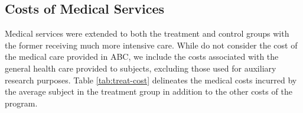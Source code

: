 \begin{comment}
Equipment \& Supplies  & 1,068 & 1,133 &1,133 &1,154 &1,154&5,642 \\ %
Transportation  & 293 & 293 &293 &293 &293 &1,463\\ %
Facilities  & 1,289 & 1,289 &1,289 & 1,289& 1,289&5,445\\ %
Miscellaneous  & 81 & 81 & 81 & 81 & 81&405 \\ %
Food  & 280  & 1,133 &1,417 &1,417 &1,417 &5,664\\ %
\\
\textbf{Total} &3,914&3,994&5,078&5,078&5,078&21,242\\ \hline
\textbf{Total Across Categories}&12,056&13,422&12,501&12,296&12,296&60,788\\ \hline \hline
\end{tabular}
\scriptsize
\begin{tablenotes}
\item Source: \cite{masse2002benefit}. \\
\item Note: This table reports the cost per subject for every year of program participation of the treatment group. All amounts are inflated to 2014 USD. Transportation costs refer to the fuel, general maintenance, insurance cost of daily transportation of treated individuals to and from the center. Costs for facilities are rental costs.
\end{tablenotes}
\end{threeparttable}
\end{table}

\end{comment}

\subsection{Costs of Medical Services} \label{sec:medical}
\noindent Medical services were extended to both the treatment and control groups with the
former receiving much more intensive care. While \cite{Barnett_Masse_2002_benefitcost} do not consider the cost of the medical care provided in ABC, we include the costs associated with the general health care provided to subjects, excluding
those used for auxiliary research purposes.
Table \ref{tab:treat-cost} delineates the medical costs incurred by the average subject in the treatment group in addition to the other costs of the program. \\

